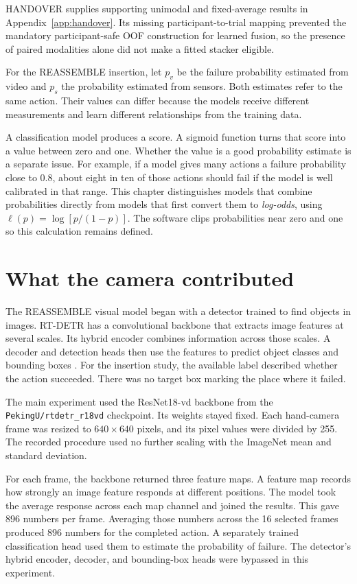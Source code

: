 HANDOVER supplies supporting unimodal and fixed-average results in
Appendix~\ref{app:handover}. Its missing participant-to-trial mapping prevented the
mandatory participant-safe OOF construction for learned fusion, so the presence of
paired modalities alone did not make a fitted stacker eligible.

For the REASSEMBLE insertion, let \(p_v\) be the failure probability estimated from
video and \(p_s\) the probability estimated from sensors. Both estimates refer to the
same action. Their values can differ because the models receive different measurements
and learn different relationships from the training data.

A classification model produces a score. A sigmoid function turns that score into a
value between zero and one. Whether the value is a good probability estimate is a
separate issue. For example, if a model gives many actions a failure probability close
to 0.8, about eight in ten of those actions should fail if the model is well calibrated
in that range. This chapter distinguishes models that combine probabilities directly
from models that first convert them to \textit{log-odds}, using
\(\ell(p)=\log[p/(1-p)]\). The software clips probabilities near zero and one so this
calculation remains defined.

\section{What the camera contributed}

The REASSEMBLE visual model began with a detector trained to find objects in images.
RT-DETR has a convolutional backbone that extracts image features at several scales. Its
hybrid encoder combines information across those scales. A decoder and detection heads
then use the features to predict object classes and bounding boxes
\parencite{Zhao2024RTDETR}. For the insertion study, the available label described
whether the action succeeded. There was no target box marking the place where it failed.

The main experiment used the ResNet18-vd backbone from the
\texttt{PekingU/rtdetr\_r18vd} checkpoint. Its weights stayed fixed. Each hand-camera
frame was resized to \(640 \times 640\) pixels, and its pixel values were divided by
255. The recorded procedure used no further scaling with the ImageNet mean and standard
deviation.

For each frame, the backbone returned three feature maps. A feature map records how
strongly an image feature responds at different positions. The model took the average
response across each map channel and joined the results. This gave 896 numbers per
frame. Averaging those numbers across the 16 selected frames produced 896 numbers for
the completed action. A separately trained classification head used them to estimate the
probability of failure. The detector’s hybrid encoder, decoder, and bounding-box heads
were bypassed in this experiment.

